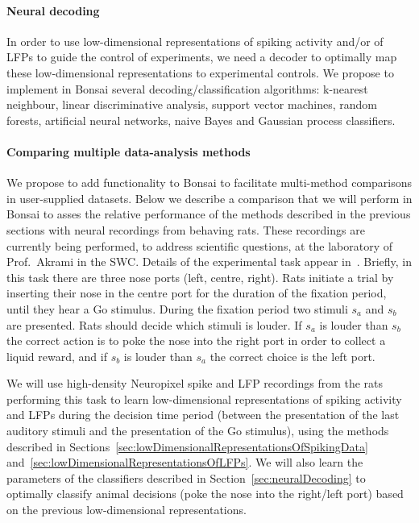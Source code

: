 \paragraph{Neural decoding}

In order to use low-dimensional representations of spiking activity and/or of
LFPs to guide the control of experiments, we need a decoder to optimally map
these low-dimensional representations to experimental controls.
%
We propose to implement in Bonsai several decoding/classification algorithms:
k-nearest neighbour, linear discriminative analysis, support vector machines,
random forests, artificial neural networks, naive Bayes and Gaussian process
classifiers.

\paragraph{Comparing multiple data-analysis methods}

We propose to add functionality to Bonsai to facilitate multi-method
comparisons in user-supplied datasets. Below we describe a comparison that we
will perform in Bonsai to asses the relative performance of the methods
described in the previous sections with neural recordings from behaving rats.
These recordings are currently being performed, to address scientific questions,
at the laboratory of Prof.~Akrami in the SWC.
%
Details of the experimental task appear in~\citet{akramiEtAl18}.
%
Briefly, in this task there are three nose ports (left, centre, right). Rats
initiate a trial by inserting their nose in the centre port for the duration of
the fixation period, until they hear a Go stimulus. During the fixation period
two stimuli $s_a$ and $s_b$ are presented. Rats should decide which stimuli is
louder. If $s_a$ is louder than $s_b$ the correct action is to poke the nose
into the right port in order to collect a liquid reward, and if $s_b$ is louder
than $s_a$ the correct choice is the left port.

We will use high-density Neuropixel spike and LFP recordings from the rats
performing this task to learn low-dimensional representations of spiking
activity and LFPs during the decision time period (between the presentation of
the last auditory stimuli and the presentation of the Go stimulus), using the
methods described in
Sections~\ref{sec:lowDimensionalRepresentationsOfSpikingData}
and~\ref{sec:lowDimensionalRepresentationsOfLFPs}. We will also learn the
parameters of the classifiers described in Section~\ref{sec:neuralDecoding} to
optimally classify animal decisions (poke the nose into the right/left port)
based on the previous low-dimensional representations.


